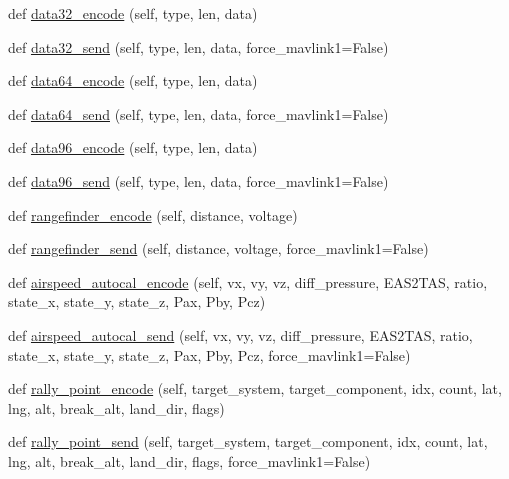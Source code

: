 \begin{DoxyCompactItemize}
\item 
def \hyperlink{classpymavlink_1_1dialects_1_1v10_1_1MAVLink_ab3d1bd6322296592571df58a13991ff1}{data32\+\_\+encode} (self, type, len, data)
\item 
def \hyperlink{classpymavlink_1_1dialects_1_1v10_1_1MAVLink_a70f1fcd5dd9f61bea6c94ec9fb4171db}{data32\+\_\+send} (self, type, len, data, force\+\_\+mavlink1=False)
\item 
def \hyperlink{classpymavlink_1_1dialects_1_1v10_1_1MAVLink_af1b1f0c45e76cfac7874724483955849}{data64\+\_\+encode} (self, type, len, data)
\item 
def \hyperlink{classpymavlink_1_1dialects_1_1v10_1_1MAVLink_a7d7f6ce72d5a0acf702814721908ba91}{data64\+\_\+send} (self, type, len, data, force\+\_\+mavlink1=False)
\item 
def \hyperlink{classpymavlink_1_1dialects_1_1v10_1_1MAVLink_a465fa101ba242e53a8d226eaa857dc66}{data96\+\_\+encode} (self, type, len, data)
\item 
def \hyperlink{classpymavlink_1_1dialects_1_1v10_1_1MAVLink_a85bd551cf12569e5507f4c5a4335c39e}{data96\+\_\+send} (self, type, len, data, force\+\_\+mavlink1=False)
\item 
def \hyperlink{classpymavlink_1_1dialects_1_1v10_1_1MAVLink_a646350ba0971ced6823adf4d922a5766}{rangefinder\+\_\+encode} (self, distance, voltage)
\item 
def \hyperlink{classpymavlink_1_1dialects_1_1v10_1_1MAVLink_a307e39052e92e41dad44ee42ee67ce2e}{rangefinder\+\_\+send} (self, distance, voltage, force\+\_\+mavlink1=False)
\item 
def \hyperlink{classpymavlink_1_1dialects_1_1v10_1_1MAVLink_ab2dc0690decc76930c508416314a37e3}{airspeed\+\_\+autocal\+\_\+encode} (self, vx, vy, vz, diff\+\_\+pressure, E\+A\+S2\+T\+AS, ratio, state\+\_\+x, state\+\_\+y, state\+\_\+z, Pax, Pby, Pcz)
\item 
def \hyperlink{classpymavlink_1_1dialects_1_1v10_1_1MAVLink_a43676dc6255d03bd64c8261e4c623eaf}{airspeed\+\_\+autocal\+\_\+send} (self, vx, vy, vz, diff\+\_\+pressure, E\+A\+S2\+T\+AS, ratio, state\+\_\+x, state\+\_\+y, state\+\_\+z, Pax, Pby, Pcz, force\+\_\+mavlink1=False)
\item 
def \hyperlink{classpymavlink_1_1dialects_1_1v10_1_1MAVLink_a88d5ff5e6b7aed30ee57e7635bd80b6e}{rally\+\_\+point\+\_\+encode} (self, target\+\_\+system, target\+\_\+component, idx, count, lat, lng, alt, break\+\_\+alt, land\+\_\+dir, flags)
\item 
def \hyperlink{classpymavlink_1_1dialects_1_1v10_1_1MAVLink_a57e592af9dd4df45eb589b549f1fff00}{rally\+\_\+point\+\_\+send} (self, target\+\_\+system, target\+\_\+component, idx, count, lat, lng, alt, break\+\_\+alt, land\+\_\+dir, flags, force\+\_\+mavlink1=False)

\end{DoxyCompactItemize}
